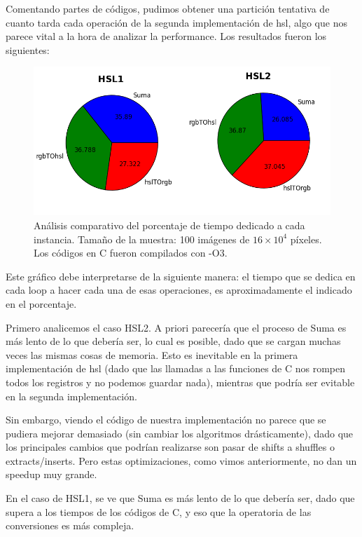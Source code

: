 Comentando partes de códigos, pudimos obtener una partición tentativa de cuanto tarda cada operación de la segunda implementación de hsl, algo que nos parece vital a la hora de analizar la performance. Los resultados fueron los siguientes:


\begin{figure}[H] 
	\centering
  \includegraphics[scale=0.7]{images/hsl-div.png}
  \caption{Análisis comparativo del porcentaje de tiempo dedicado a cada instancia. Tamaño de la muestra: 100 imágenes de $16\times 10^4$ píxeles. Los códigos en C fueron compilados con -O3.}
\end{figure}

Este gráfico debe interpretarse de la siguiente manera: el tiempo que se dedica en cada loop a hacer cada una de esas operaciones, es aproximadamente el indicado en el porcentaje.

Primero analicemos el caso HSL2. A priori parecería que el proceso de Suma es más lento de lo que debería ser, lo cual es posible, dado que se cargan muchas veces las mismas cosas de memoria. Esto es inevitable en la primera implementación de hsl (dado que las llamadas a las funciones de C nos rompen todos los registros y no podemos guardar nada), mientras que podría ser evitable en la segunda implementación.

Sin embargo, viendo el código de nuestra implementación no parece que se pudiera mejorar demasiado (sin cambiar los algoritmos drásticamente), dado que los principales cambios que podrían realizarse son pasar de shifts a shuffles o extracts/inserts. Pero estas optimizaciones, como vimos anteriormente, no dan un speedup muy grande.

En el caso de HSL1, se ve que Suma es más lento de lo que debería ser, dado que supera a los tiempos de los códigos de C, y eso que la operatoria de las conversiones es más compleja. \\

